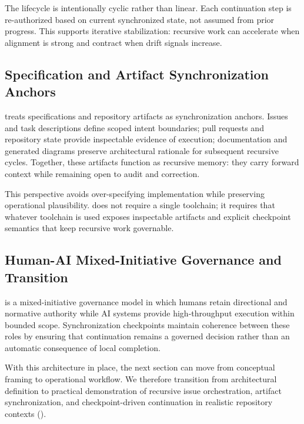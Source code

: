 The lifecycle is intentionally cyclic rather than linear. Each continuation step is re-authorized based on current synchronized state, not assumed from prior progress. This supports iterative stabilization: recursive work can accelerate when alignment is strong and contract when drift signals increase.

\subsection{Specification and Artifact Synchronization Anchors}

 treats specifications and repository artifacts as synchronization anchors. Issues and task descriptions define scoped intent boundaries; pull requests and repository state provide inspectable evidence of execution; documentation and generated diagrams preserve architectural rationale for subsequent recursive cycles. Together, these artifacts function as recursive memory: they carry forward context while remaining open to audit and correction.

This perspective avoids over-specifying implementation while preserving operational plausibility.  does not require a single toolchain; it requires that whatever toolchain is used exposes inspectable artifacts and explicit checkpoint semantics that keep recursive work governable.

\subsection{Human-AI Mixed-Initiative Governance and Transition}

 is a mixed-initiative governance model in which humans retain directional and normative authority while AI systems provide high-throughput execution within bounded scope. Synchronization checkpoints maintain coherence between these roles by ensuring that continuation remains a governed decision rather than an automatic consequence of local completion.

With this architecture in place, the next section can move from conceptual framing to operational workflow. We therefore transition from architectural definition to practical demonstration of recursive issue orchestration, artifact synchronization, and checkpoint-driven continuation in realistic repository contexts ().
